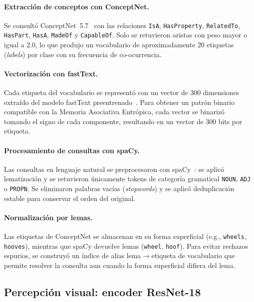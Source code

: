 \paragraph{Extracción de conceptos con ConceptNet.}
Se consultó ConceptNet~5.7~\cite{speer2017conceptnet} con las relaciones \texttt{IsA}, \texttt{HasProperty}, \texttt{RelatedTo}, \texttt{HasPart}, \texttt{HasA}, \texttt{MadeOf} y \texttt{CapableOf}.
Solo se retuvieron aristas con peso mayor o igual a 2.0, lo que produjo un vocabulario de aproximadamente 20 etiquetas (\textit{labels}) por clase con su frecuencia de co-ocurrencia.

\paragraph{Vectorización con fastText.}
Cada etiqueta del vocabulario se representó con un vector de 300 dimensiones extraído del modelo fastText preentrenado~\cite{bojanowski2017fasttext}.
Para obtener un patrón binario compatible con la Memoria Asociativa Entrópica, cada vector se binarizó tomando el signo de cada componente, resultando en un vector de 300 bits por etiqueta.

\paragraph{Procesamiento de consultas con spaCy.}
Las consultas en lenguaje natural se preprocesaron con spaCy~\cite{honnibal2020spacy}: se aplicó lematización y se retuvieron únicamente tokens de categoría gramatical \texttt{NOUN}, \texttt{ADJ} o \texttt{PROPN}.
Se eliminaron palabras vacías (\textit{stopwords}) y se aplicó deduplicación estable para conservar el orden del original.

\paragraph{Normalización por lemas.}
Las etiquetas de ConceptNet se almacenan en su forma superficial (e.g., \texttt{wheels}, \texttt{hooves}), mientras que spaCy devuelve lemas (\texttt{wheel}, \texttt{hoof}).
Para evitar rechazos espurios, se construyó un índice de alias lema$\to$etiqueta de vocabulario que permite resolver la consulta aun cuando la forma superficial difiera del lema.

\subsection{Percepción visual: encoder ResNet-18}
\label{sec:percepcion}

